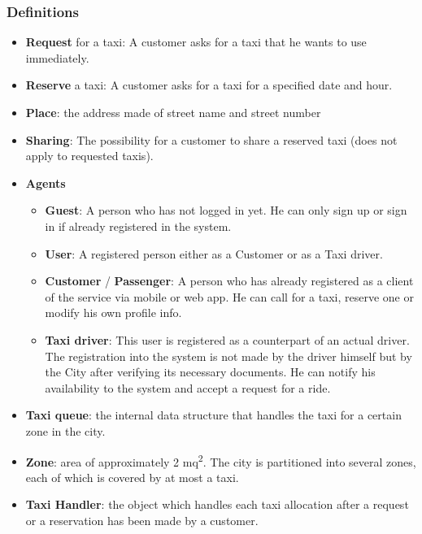 \subsubsection{Definitions}
	\begin{itemize}
		\item \textbf{Request} for a taxi: A customer asks for a taxi that he wants to use immediately. 
		\item \textbf{Reserve} a taxi: A customer asks for a taxi for a specified date and hour.
		\item \textbf{Place}: the address made of street name and street number
		\item \textbf{Sharing}: The possibility for a customer to share a reserved taxi (does not apply to requested taxis).		
		
		\item \textbf{Agents}
		\begin{itemize}
			\item \textbf{Guest}: A person who has not logged in yet. He can only sign up or sign in if already registered in the system.
			\item \textbf{User}: A registered person either as a Customer or as a Taxi driver.
			\item \textbf{Customer} / \textbf{Passenger}: A person who has already registered as a client of the service via mobile or web app. He can call for a taxi, reserve one or modify his own profile info.
			\item \textbf{Taxi driver}: This user is registered as a counterpart of an actual driver. The registration into the system is not made by the driver himself but by the City after verifying its necessary documents. He can notify his availability to the system and accept a request for a ride.
		\end{itemize}
		
		\item \textbf{Taxi queue}: the internal data structure that handles the taxi for a certain zone in the city.

	
		\item \textbf{Zone}: area of approximately 2 mq\textsuperscript{2}. The city is partitioned into several zones, each of which is covered by at most a taxi.
		
		\item \textbf{Taxi Handler}: the object which handles each taxi allocation after a request or a reservation has been made by a customer.
\end{itemize}
	
